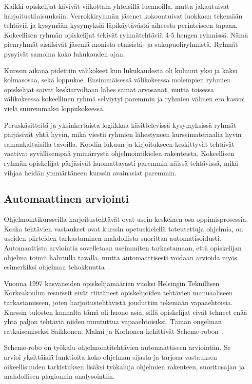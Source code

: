 \documentclass[finnish]{../tktltiki2}
\theoremstyle{definition}
\theoremstyle{remark}
\begin{document}
Kaikki opiskelijat kävivät viikottain yhteisillä luennoilla, mutta jakautuivat harjoitustilaisuuksiin. Verrokkiryhmän jäsenet kokoontuivat luokkaan tekemään tehtäviä ja kysymään kysymyksiä läpikäytävästä aiheesta perinteiseen tapaan. Kokeellisen ryhmän opiskelijat tekivät ryhmätehtäviä 4-5 hengen ryhmissä. Nämä pienryhmät sisälsivät jäseniä monista etnisistä- ja sukupuoliryhmistä. Ryhmät pysyivät samoina koko lukukauden ajan.

Kurssin aikana pidettiin välikokeet kun lukukaudesta oli kulunut yksi ja kaksi kolmasosaa, sekä loppukoe. Ensimmäisessä välikokeessa molempien ryhmien opiskelijat saivat keskiarvoltaan lähes samat arvosanat, mutta toisessa välikokeessa kokeellinen ryhmä selviytyi paremmin ja ryhmien välinen ero kasvoi vielä suuremmaksi loppukokeessa.

Peruskäsitteitä ja yksinkertaista logiikkaa käsittelevissä kysymyksissä ryhmät pärjäsivät yhtä hyvin, mikä viestii ryhmien lähestyneen kurssimateriaalia hyvin samankaltaisilla tavoilla. Koodin lukuun ja kirjoitukseen keskittyvät tehtävät vaativat syvällisempää ymmärrystä ohjelmointikielen rakenteista. Kokeellisen ryhmän opiskelijat pärjäsivät huomattavasti paremmin näissä tehtävissä, mikä vihjaa heidän ymmärtäneen kurssin avainasiat paremmin.

\subsection{Automaattinen arviointi}

Ohjelmointikursseilla harjoitustehtävät ovat usein keskeinen osa oppimisprosessia. Koska tehtävien vastaukset ovat kurssin opetuskielellä toteutettuja ohjelmia, on useiden piirteiden tarkastaminen mahdollista suorittaa automatisoidusti. Automaattista arviointia sovelletaan useimmiten tarkastamaan, että opiskelijan ohjelma toimii halutulla tavalla, mutta automaattisesti voidaan arvioida myös esimerkiksi ohjelman tehokkuutta~\cite{A05}.

Vuonna 1997 kasvaneiden opiskelijamäärien vuoksi Helsingin Teknillisen Korkeakoulun resurssit eivät riittäneet opiskelijoiden tehtävien manuaaliseen tarkastamiseen, joten harjoitustehtävistä jouduttiin tekemään vapaaehtoisia. Kurssin tulosten kannalta tämä oli huono asia, sillä opiskelijat eivät tehneet enää yhtä paljon tehtäviä niiden muututtua vapaaehtoisiksi. Tämän ongelman ratkaisemiseksi Saikkonen, Malmi ja Korhonen kehittivät Scheme-robon~\cite{SMK01}.

Scheme-robo on työkalu ohjelmointitehtävien automaattiseen arviointiin. Se arvioi yksittäisiä funktioita koko ohjelman sijasta ja tarjoaa vastauksen oikeellisuuden tarkistuksen lisäksi työkaluja ohjelmien rakenteen, suoritusajan ja mahdollisen plagionnin analysointiin.
\end{document}
